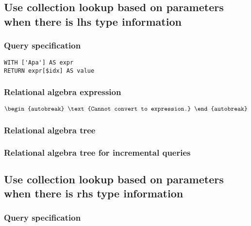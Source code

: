 
\subsection{Use collection lookup based on parameters when there is lhs type information}

\subsubsection*{Query specification}

\begin{lstlisting}
WITH ['Apa'] AS expr
RETURN expr[$idx] AS value
\end{lstlisting}

\subsubsection*{Relational algebra expression}

\begin{align*}
\begin{autobreak}
\text{Cannot convert to expression.}
\end{autobreak}
\end{align*}

\subsubsection*{Relational algebra tree}


\subsubsection*{Relational algebra tree for incremental queries}


\subsection{Use collection lookup based on parameters when there is rhs type information}

\subsubsection*{Query specification}

